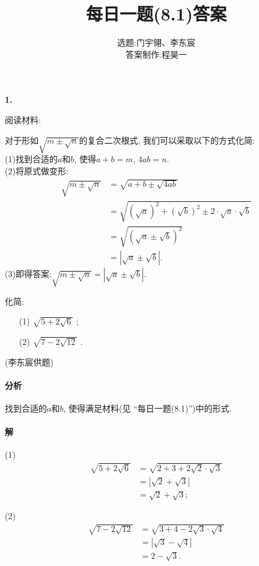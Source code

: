 \documentclass{article}
\title{每日一题(8.1)答案}
\author{选题:门宇翎、李东宸\\答案制作:程昊一}
\begin{document}
\maketitle
\textbf{1.}{\kaishu 阅读材料:
{\fangsong
	\par 对于形如$\sqrt{m\pm\sqrt{n}}$的复合二次根式, 我们可以采取以下的方式化简: \\
	(1)\quad 找到合适的$a$和$b$, 使得$a+b=m$, $4ab=n$.\\
	(2)\quad 将原式做变形:
	\begin{align*}
		\sqrt{m\pm\sqrt{n}}&=\sqrt{a+b\pm\sqrt{4ab}}\\
		&=\sqrt{\left(\sqrt{a}\right)^2+\left(\sqrt{b}\right)^2\pm2\cdot\sqrt{a}\cdot\sqrt{b}}\\
		&=\sqrt{\left(\sqrt{a}\pm\sqrt{b}\right)^2}\\
		&=\left|\sqrt{a}\pm\sqrt{b}\right|.
	\end{align*}
	(3)\quad 即得答案:$\sqrt{m\pm\sqrt{n}}=\left|\sqrt{a}\pm\sqrt{b}\right|$.
}
\par 化简: 
\begin{itemize}
	\item[(1)]$\sqrt{5+2\sqrt{6}}$ ; 
	\item[(2)]$\sqrt{7-2\sqrt{12}}$ . 
\end{itemize}
(李东宸供题)}
\paragraph{分析}找到合适的$a$和$b$, 使得满足材料(见 “每日一题(8.1)”)中的形式.
\paragraph{解}(1)
\begin{align*}
	\sqrt{5+2\sqrt{6}}&=\sqrt{2+3+2\sqrt{2}\cdot\sqrt{3}}\\
	&=\left|\sqrt{2}+\sqrt{3}\right|\\
	&=\sqrt{2}+\sqrt{3}; 
\end{align*}
\par(2)
\begin{align*}
	\sqrt{7-2\sqrt{12}}&=\sqrt{3+4-2\sqrt{3}\cdot\sqrt{4}}\\
	&=\left|\sqrt{3}-\sqrt{4}\right|\\
	&=2-\sqrt{3}.
\end{align*}
\end{document}
